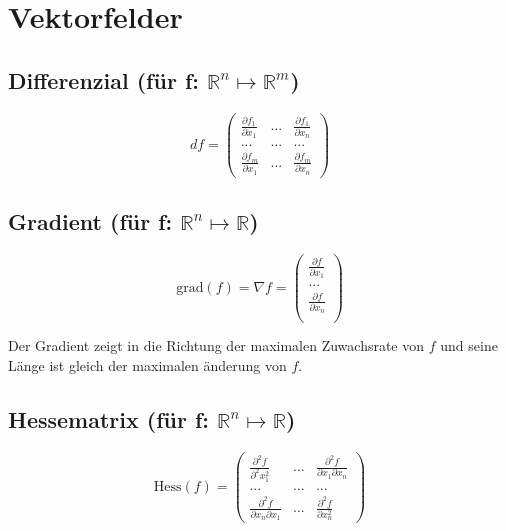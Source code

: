 \documentclass[11pt]{article}
\begin{document}
\section{Vektorfelder}

\subsection{Differenzial (f{\"u}r f: $\mathbb{R}^n \mapsto \mathbb{R}^m$)}

\begin{equation*}
	df = \begin{pmatrix}
		\frac{\partial f_1}{\partial x_1} & ... & \frac{\partial f_1}{\partial x_n} \\
		... & ... & ... \\
		\frac{\partial f_m}{\partial x_1} & ... & \frac{\partial f_m}{\partial x_n}
	\end{pmatrix}
\end{equation*}

\subsection{Gradient (f{\"u}r f: $\mathbb{R}^n \mapsto \mathbb{R}$)}

\begin{equation*}
	\text{grad}(f)=\nabla f=
	\begin{pmatrix}
		\frac{\partial f}{\partial x_1}\\
		...\\
		\frac{\partial f}{\partial x_n}\\
	\end{pmatrix}
\end{equation*}

Der Gradient zeigt in die Richtung der maximalen Zuwachsrate von $f$ und seine L{\"a}nge ist gleich der maximalen {\"a}nderung von $f$.

\subsection{Hessematrix (f{\"u}r f: $\mathbb{R}^n \mapsto \mathbb{R}$)}

\begin{equation*}
	\text{Hess}(f)=
	\begin{pmatrix}
		\frac{\partial^2 f}{\partial^2x_1^2} & ... & \frac{\partial^2 f}{\partial x_1 \partial x_n}\\
		...&...&...\\
		\frac{\partial^2 f}{\partial x_n \partial x_1} & ... & \frac{\partial^2 f}{\partial x_n^2}
	\end{pmatrix}
\end{equation*}
\end{document}
